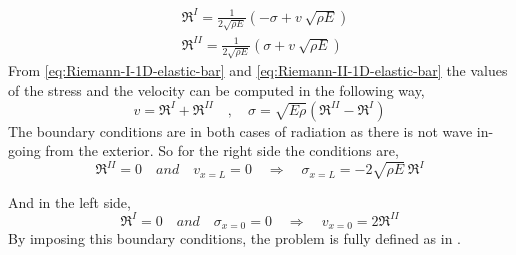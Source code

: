 \documentclass[preprint,12pt,a4paper]{elsarticle}
\begin{document}
\begin{align}
  \label{eq:Riemann-I-1D-elastic-bar}
  &\Re^{I} = \frac{1}{2\sqrt{\rho E}}\left(-\sigma + v\ \sqrt{\rho E}
    \right)\\
  \label{eq:Riemann-II-1D-elastic-bar}
  &\Re^{II} = \frac{1}{2\sqrt{\rho E}}\left(\sigma + v\ \sqrt{\rho E} \right)
\end{align}
From \eqref{eq:Riemann-I-1D-elastic-bar} and
\eqref{eq:Riemann-II-1D-elastic-bar} the values of the
stress and the velocity can be computed in the following way,
\begin{equation}
  \label{eq:Riemann-stress-velocity}
  v = \Re^{I} + \Re^{II} \quad , \quad \sigma = \sqrt{E \rho}\left(\Re^{II} - \Re^{I} \right)
\end{equation}
The boundary conditions are in both cases of radiation as there is not
wave in-going from the exterior. So for the right side the conditions are,
\begin{equation*}
  \Re^{II} = 0 \quad and \quad v_{x=L} = 0 \quad\Rightarrow \quad \sigma_{x=L} = -2\sqrt{\rho E}\ \Re^{I}
\end{equation*} 

And in the left side,
\begin{equation*}
  \Re^{I} = 0 \quad and \quad \sigma_{x=0} = 0  \quad \Rightarrow
  \quad v_{x=0} = 2\Re^{II}
\end{equation*}
By imposing this boundary conditions, the problem is fully defined as in \cite{Dyka1995}.


\end{document}
